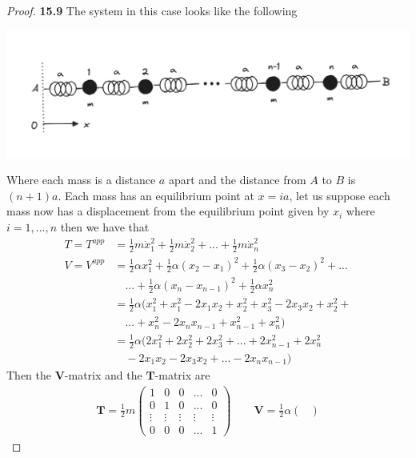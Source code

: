 \documentclass[11pt]{article}
\theoremstyle{definition}
\begin{document}
\begin{proof}{\textbf{15.9}}
    The system in this case looks like the following 
    \begin{center}
        \includegraphics[scale=0.4]{ch15-9.png}
    \end{center}
    Where each mass is a distance $a$ apart and the distance from $A$
    to $B$ is $(n+1)a$. Each mass has an equilibrium point at $x=ia$,
    let us suppose each mass now has a displacement from the equilibrium
    point given by $x_i$ where $i=1,...,n$ then we have that
    \begin{align*}
        T = T^{app} &= \frac{1}{2}m\dot{x}_1^2 + \frac{1}{2}m\dot{x}_2^2 +
        ... + \frac{1}{2}m\dot{x}_n^2\\
        V = V^{app} &= \frac{1}{2}\alpha x_1^2 +
        \frac{1}{2}\alpha(x_2 - x_1)^2 + \frac{1}{2}\alpha(x_3 - x_2)^2 + ...\\
        &\quad... + \frac{1}{2}\alpha(x_n - x_{n-1})^2 + \frac{1}{2}\alpha x_n^2\\
        &= \frac{1}{2}\alpha(
            x_1^2 + x_1^2 -2x_1 x_2 + x_2^2 + x_3^2 -2x_3 x_2 + x_2^2 +\\
            &\quad... + x_n^2 -2x_nx_{n-1} +x_{n-1}^2 + x_n^2)\\
        &= \frac{1}{2}\alpha(
            2x_1^2 + 2x_2^2 + 2x_3^2 + ... + 2x_{n-1}^2 + 2x_n^2\\
            &\quad -2x_1 x_2 -2x_3 x_2 + ... -2x_nx_{n-1} )
    \end{align*}
    Then the $\bm{V}$-matrix and the $\bm{T}$-matrix are 
    \begin{align*}
        \bm{T} = \frac{1}{2}m\begin{pmatrix}
            1  & 0 & 0 &... & 0\\
            0 & 1 & 0 &... & 0\\
            \vdots & \vdots & \vdots & \vdots & \vdots\\
            0 & 0 & 0 &... & 1
        \end{pmatrix}
        \quad\quad
        \bm{V} = \frac{1}{2}\alpha\begin{pmatrix}

\end{pmatrix}
\end{align*}
\end{proof}
\end{document}
